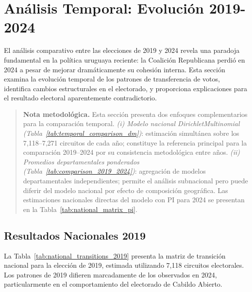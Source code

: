 
\section{Análisis Temporal: Evolución 2019-2024}
\label{sec:resultados_temporal}

El análisis comparativo entre las elecciones de 2019 y 2024 revela una paradoja fundamental en la política uruguaya reciente: la Coalición Republicana perdió en 2024 a pesar de mejorar dramáticamente su cohesión interna. Esta sección examina la evolución temporal de los patrones de transferencia de votos, identifica cambios estructurales en el electorado, y proporciona explicaciones para el resultado electoral aparentemente contradictorio.

\begin{quote}
\small\textbf{Nota metodológica.} Esta sección presenta dos enfoques complementarios para la comparación temporal. \textit{(i) Modelo nacional DirichletMultinomial (Tabla~\ref{tab:temporal_comparison_dm})}: estimación simultánea sobre los 7{,}118--7{,}271 circuitos de cada año; constituye la referencia principal para la comparación 2019--2024 por su consistencia metodológica entre años. \textit{(ii) Promedios departamentales ponderados (Tabla~\ref{tab:comparison_2019_2024})}: agregación de modelos departamentales independientes; permite el análisis subnacional pero puede diferir del modelo nacional por efecto de composición geográfica. Las estimaciones nacionales directas del modelo con PI para 2024 se presentan en la Tabla~\ref{tab:national_matrix_pi}.
\end{quote}

\subsection{Resultados Nacionales 2019}
\label{sec:resultados_2019}

La Tabla~\ref{tab:national_transitions_2019} presenta la matriz de transición nacional para la elección de 2019, estimada utilizando 7{,}118 circuitos electorales. Los patrones de 2019 difieren marcadamente de los observados en 2024, particularmente en el comportamiento del electorado de Cabildo Abierto.



